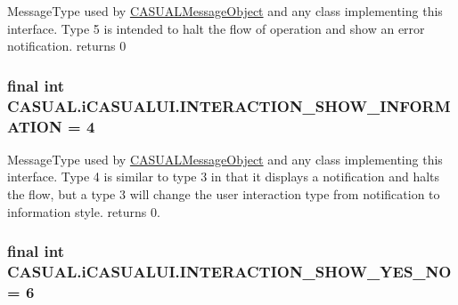 Message\-Type used by \hyperlink{class_c_a_s_u_a_l_1_1_c_a_s_u_a_l_message_object}{C\-A\-S\-U\-A\-L\-Message\-Object} and any class implementing this interface. Type 5 is intended to halt the flow of operation and show an error notification. returns 0 \hypertarget{interface_c_a_s_u_a_l_1_1i_c_a_s_u_a_l_u_i_abd49e7ec0d06d1cf3ed35966a1353198}{
\subsubsection[{I\-N\-T\-E\-R\-A\-C\-T\-I\-O\-N\-\_\-\-S\-H\-O\-W\-\_\-\-I\-N\-F\-O\-R\-M\-A\-T\-I\-O\-N}]{\setlength{\rightskip}{0pt plus 5cm}final int C\-A\-S\-U\-A\-L.\-i\-C\-A\-S\-U\-A\-L\-U\-I.\-I\-N\-T\-E\-R\-A\-C\-T\-I\-O\-N\-\_\-\-S\-H\-O\-W\-\_\-\-I\-N\-F\-O\-R\-M\-A\-T\-I\-O\-N = 4}}\label{interface_c_a_s_u_a_l_1_1i_c_a_s_u_a_l_u_i_abd49e7ec0d06d1cf3ed35966a1353198}
Message\-Type used by \hyperlink{class_c_a_s_u_a_l_1_1_c_a_s_u_a_l_message_object}{C\-A\-S\-U\-A\-L\-Message\-Object} and any class implementing this interface. Type 4 is similar to type 3 in that it displays a notification and halts the flow, but a type 3 will change the user interaction type from notification to information style. returns 0. \hypertarget{interface_c_a_s_u_a_l_1_1i_c_a_s_u_a_l_u_i_ab14fbf025c12a1a217826aa8c0cae48e}{
\subsubsection[{I\-N\-T\-E\-R\-A\-C\-T\-I\-O\-N\-\_\-\-S\-H\-O\-W\-\_\-\-Y\-E\-S\-\_\-\-N\-O}]{\setlength{\rightskip}{0pt plus 5cm}final int C\-A\-S\-U\-A\-L.\-i\-C\-A\-S\-U\-A\-L\-U\-I.\-I\-N\-T\-E\-R\-A\-C\-T\-I\-O\-N\-\_\-\-S\-H\-O\-W\-\_\-\-Y\-E\-S\-\_\-\-N\-O = 6}}\label{interface_c_a_s_u_a_l_1_1i_c_a_s_u_a_l_u_i_ab14fbf025c12a1a217826aa8c0cae48e}
